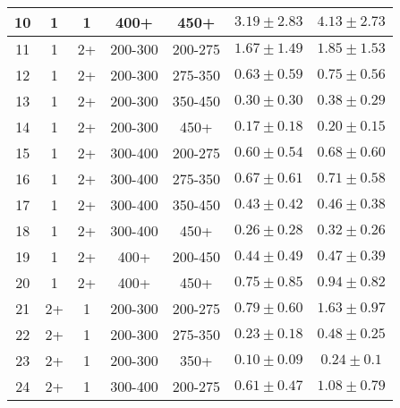 \begin{table}[htbp]
{\begin{tabular}{|c|c|c|c|c||c|c|}
 \hline
             10 &               1 &               1 &            400+ &            450+ & $3.19 \pm 2.83$ & $ 4.13 \pm 2.73 $\\
 \hline
             11 &               1 &              2+ &         200-300 &         200-275 & $1.67 \pm 1.49$ & $ 1.85 \pm 1.53 $\\
 \hline
             12 &               1 &              2+ &         200-300 &         275-350 & $0.63 \pm 0.59$ & $ 0.75 \pm 0.56 $\\
 \hline
             13 &               1 &              2+ &         200-300 &         350-450 & $0.30 \pm 0.30$ & $ 0.38 \pm 0.29 $\\
 \hline
             14 &               1 &              2+ &         200-300 &            450+ & $0.17 \pm 0.18$ & $ 0.20 \pm 0.15 $\\
 \hline
             15 &               1 &              2+ &         300-400 &         200-275 & $0.60 \pm 0.54$ & $ 0.68 \pm 0.60 $\\
 \hline
             16 &               1 &              2+ &         300-400 &         275-350 & $0.67 \pm 0.61$ & $ 0.71 \pm 0.58 $\\
 \hline
             17 &               1 &              2+ &         300-400 &         350-450 & $0.43 \pm 0.42$ & $ 0.46 \pm 0.38 $\\
 \hline
             18 &               1 &              2+ &         300-400 &            450+ & $0.26 \pm 0.28$ & $ 0.32 \pm 0.26 $\\
 \hline
             19 &               1 &              2+ &            400+ &         200-450 & $0.44 \pm 0.49$ & $ 0.47 \pm 0.39 $\\
 \hline
             20 &               1 &              2+ &            400+ &            450+ & $0.75 \pm 0.85$ & $ 0.94 \pm 0.82 $\\
 \hline
             21 &              2+ &               1 &         200-300 &         200-275 & $0.79 \pm 0.60$ & $ 1.63 \pm 0.97 $\\
 \hline
             22 &              2+ &               1 &         200-300 &         275-350 & $0.23 \pm 0.18$ & $ 0.48 \pm 0.25 $\\
 \hline
             23 &              2+ &               1 &         200-300 &            350+ & $0.10 \pm 0.09$ & $ 0.24 \pm 0.1 $\\
 \hline
             24 &              2+ &               1 &         300-400 &         200-275 & $0.61 \pm 0.47$ & $ 1.08 \pm 0.79 $\\

\end{tabular}}
\end{table}

